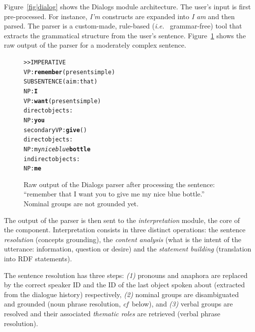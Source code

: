 \documentclass[twocolumn]{svjour3}
\newcommand{\ie}{{\textit{i.e.~}}}
\newcommand{\cf}{{\textit{cf~}}}
\begin{document}
Figure~\ref{fig|dialog} shows the {\sc Dialogs} module architecture. The user's
input is first pre-processed. For instance, \emph{I'm} constructs are expanded
into \emph{I am} and then parsed. The parser is a custom-made, rule-based (\ie
grammar-free) tool that extracts the grammatical structure from the user's
sentence. Figure~\ref{dialog|parser_output} shows the raw output of the parser for a
moderately complex sentence.

\begin{figure}[!ht]
\begin{center}
\scriptsize
\begin{alltt}
>> IMPERATIVE
VP: \textbf{remember} (present simple)
    SUBSENTENCE (aim: that)
      NP: \textbf{I}
      VP: \textbf{want} (present simple)
        direct objects: 
          NP: \textbf{you}
        secondary VP: \textbf{give} ()
              direct objects:
                NP: my \emph{nice blue} \textbf{bottle}
              indirect objects:
                NP: \textbf{me}
\end{alltt}
\end{center}
\caption{Raw output of the {\sc Dialogs} parser after processing the
sentence: ``remember that I want you to give me my nice blue bottle.'' 
Nominal groups are not grounded yet.} 
\label{dialog|parser_output}
\end{figure}

The output of the parser is then sent to the \emph{interpretation} module, the
core of the component.  Interpretation consists in three distinct operations:
the sentence \emph{resolution} (concepts grounding), the \emph{content
analysis} (what is the intent of the utterance: information, question or
desire) and the \emph{statement building} (translation into RDF statements).

The sentence resolution has three steps: {\it(1)} pronouns and anaphora are
replaced by the correct speaker ID and the ID of the last object spoken about
(extracted from the dialogue history) respectively, {\it(2)} nominal groups are
disambiguated and grounded (noun phrase resolution, \cf below), and {\it(3)}
verbal groups are resolved and their associated \emph{thematic roles} are
retrieved (verbal phrase resolution).
\end{document}
